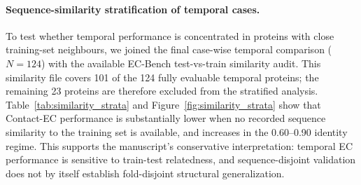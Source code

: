 \documentclass[11pt,a4paper]{article}
\begin{document}
\begin{table}[htbp]
\centering
\caption{MMseqs2 nearest-neighbour and label-coverage audit for the temporal
recency comparison. Searches use complete Level-4 EC-labelled proteins in each
training split as the target database. The newer corpora increase nearest-neighbour
identity and top-hit exact EC agreement on the matched $N=99$ subset, so the
ExpA gain should be interpreted as a recent-corpus effect that includes homolog
availability and label-frequency changes rather than a pure calendar-date effect.}
\label{tab:recency_homology_coverage}
\small
\setlength{\tabcolsep}{3pt}
\end{table}

\paragraph{Sequence-similarity stratification of temporal cases.}
To test whether temporal performance is concentrated in proteins with close
training-set neighbours, we joined the final case-wise temporal comparison
($N=124$) with the available EC-Bench test-vs-train similarity audit. This
similarity file covers 101 of the 124 fully evaluable temporal proteins; the
remaining 23 proteins are therefore excluded from the stratified analysis.
Table~\ref{tab:similarity_strata} and Figure~\ref{fig:similarity_strata} show
that Contact-EC performance is substantially lower when no recorded sequence
similarity to the training set is available, and increases in the
0.60--0.90 identity regime. This supports the manuscript's conservative
interpretation: temporal EC performance is sensitive to train-test relatedness,
and sequence-disjoint validation does not by itself establish fold-disjoint
structural generalization.
\end{document}
